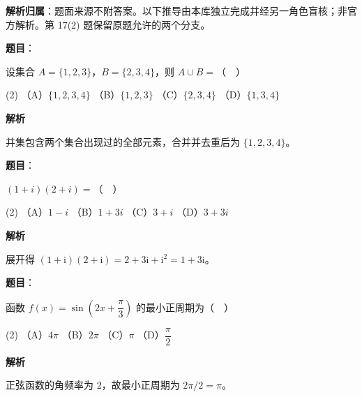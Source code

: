

\begin{gknotice}
\textbf{解析归属}：题面来源不附答案。以下推导由本库独立完成并经另一角色盲核；非官方解析。第 17(2) 题保留原题允许的两个分支。
\end{gknotice}

\begin{answer}

\textbf{题目}：

设集合 \(A=\{1,2,3\}\)，\(B=\{2,3,4\}\)，则 \(A\cup B=\)（　）

\begin{gkopts}(2)
\task （A）\(\{1,2,3,4\}\)
\task （B）\(\{1,2,3\}\)
\task （C）\(\{2,3,4\}\)
\task （D）\(\{1,3,4\}\)
\end{gkopts}

\textbf{解析}

并集包含两个集合出现过的全部元素，合并并去重后为 \(\{1,2,3,4\}\)。


\end{answer}
\begin{answer}

\textbf{题目}：

\((1+i)(2+i)=\)（　）

\begin{gkopts}(2)
\task （A）\(1-i\)
\task （B）\(1+3i\)
\task （C）\(3+i\)
\task （D）\(3+3i\)
\end{gkopts}

\textbf{解析}

展开得 \((1+\mathrm i)(2+\mathrm i)=2+3\mathrm i+\mathrm i^2=1+3\mathrm i\)。


\end{answer}
\begin{answer}

\textbf{题目}：

函数 \(f(x)=\sin\left(2x+\dfrac{\pi}{3}\right)\) 的最小正周期为（　）

\begin{gkopts}(2)
\task （A）\(4\pi\)
\task （B）\(2\pi\)
\task （C）\(\pi\)
\task （D）\(\dfrac{\pi}{2}\)
\end{gkopts}

\textbf{解析}

正弦函数的角频率为 \(2\)，故最小正周期为 \(2\pi/2=\pi\)。


\end{answer}
